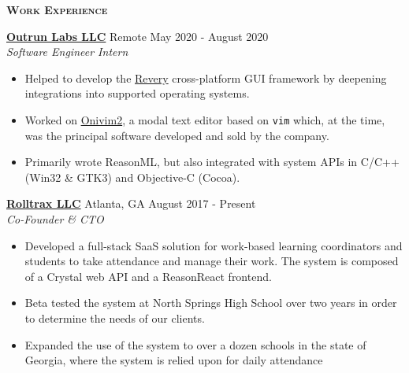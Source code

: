\documentclass{article}
\newcommand{\sectionHeader}[1]{{\large \textbf{\textsc{#1}}}\hspace{5pt}\xrfill[.5ex]{.4pt}}
\begin{document}
  \vspace{8pt}

  \sectionHeader{Work Experience}

  \href{https://www.outrunlabs.com/}{\textbf{Outrun Labs LLC}} \hspace{3pt} {\footnotesize {}} Remote \hspace*{\fill} {\footnotesize {}} \hspace{1pt} May 2020 - August 2020\\
  {\footnotesize {}} \hspace{1pt} \textit{Software Engineer Intern}
  \begin{itemize}
    \item Helped to develop the \href{https://github.com/revery-ui/revery}{Revery} cross-platform GUI framework by deepening integrations into supported operating systems.
    \item Worked on \href{https://onivim.io/}{Onivim2}, a modal text editor based on \texttt{vim} which, at the time, was the principal software developed and sold by the company.
    \item Primarily wrote ReasonML, but also integrated with system APIs in C/C++ (Win32 \& GTK3) and Objective-C (Cocoa).
  \end{itemize}

  \vspace{3pt}

  \href{https://rolltrax.com}{\textbf{Rolltrax LLC}} \hspace{3pt} {\footnotesize {}} Atlanta, GA \hspace*{\fill} {\footnotesize {}} \hspace{1pt} August 2017 - Present\\
  {\footnotesize {}} \hspace{1pt} \textit{Co-Founder \& CTO}
  \begin{itemize}
    \item Developed a full-stack SaaS solution for work-based learning coordinators and students to take attendance and manage their work. The system is composed of a Crystal web API and a ReasonReact frontend.
    \item Beta tested the system at North Springs High School over two years in order to determine the needs of our clients.
    \item Expanded the use of the system to over a dozen schools in the state of Georgia, where the system is relied upon for daily attendance
  \end{itemize}
\end{document}
